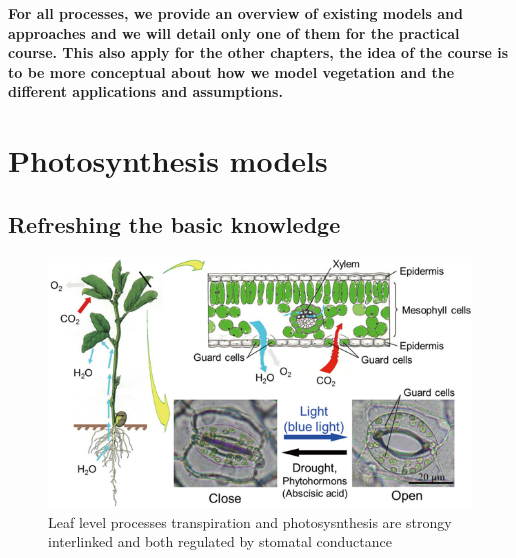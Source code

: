 \documentclass[12pt,oneside]{book}
\begin{document}

\textbf{For all processes, we provide an overview of existing models and
approaches and we will detail only one of them for the practical course.
This also apply for the other chapters, the idea of the course is to be
more conceptual about how we model vegetation and the different
applications and assumptions.}

\section{Photosynthesis models}\label{photosynthesis-models}

\subsection{Refreshing the basic
knowledge}\label{refreshing-the-basic-knowledge}

\begin{figure}

{\centering \includegraphics[width=0.8\linewidth]{figures/chap2/leaf_level_processes} 

}

\caption{Leaf level processes transpiration and photosysnthesis are strongy interlinked and both regulated by stomatal conductance}\label{fig:f21}
\end{figure}
\end{document}

